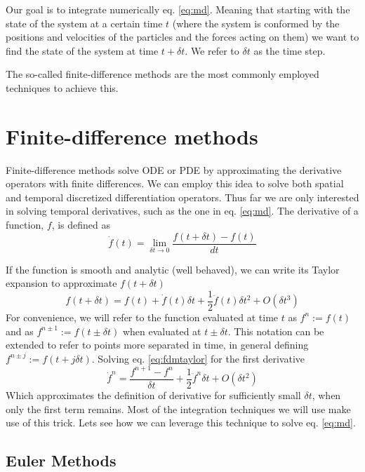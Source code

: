 \documentclass[ twoside,openright,titlepage,numbers=noenddot,%
headinclude,footinclude,cleardoublepage=empty,abstract=on,
BCOR=5mm,paper=a4,fontsize=11pt, dvipsnames
]{scrreprt}
\newcommand{\dt}{\delta t}
\newcommand{\half}{\frac{1}{2}}
\begin{document}
Our goal is to integrate numerically eq. \eqref{eq:md}. Meaning that starting with the state of the system at a certain time $t$ (where the system is conformed by the positions and velocities of the particles and the forces acting on them) we want to find the state of the system at time $t + \dt$. We refer to $\dt$ as the time step.

The so-called finite-difference methods are the most commonly employed techniques to achieve this.
\section{Finite-difference methods}
Finite-difference methods\cite{fdm} solve \gls{ODE} or \gls{PDE} by approximating the derivative operators with finite differences.
We can employ this idea to solve both spatial and temporal discretized differentiation operators. Thus far we are only interested in solving temporal derivatives, such as the one in eq. \eqref{eq:md}.
The derivative of a function, $f$, is defined as
\begin{equation}
  \dot{f}(t) = \lim_{\dt\rightarrow 0} \frac{f(t+\dt) - f(t)}{dt}
\end{equation}

If the function is smooth and analytic (well behaved), we can write its Taylor expansion to approximate $f(t+\dt)$
\begin{equation}
  \label{eq:fdmtaylor}
  f(t+\dt) = f(t)+\dot{f}(t)\dt + \half\ddot{f}(t)\dt^2 + O(\dt^3)
\end{equation}
For convenience, we will refer to the function evaluated at time $t$ as $f^n := f(t)$ and as $f^{n\pm 1} := f(t\pm \dt)$ when evaluated at $t\pm \dt$. This notation can be extended to refer to points more separated in time, in general defining $f^{n\pm j} := f(t+j\dt)$.
Solving eq. \eqref{eq:fdmtaylor} for the first derivative
\begin{equation}
 \dot{f}^n  =  \frac{f^{n+1} - f^n}{\dt} + \half\ddot{f}^n\dt + O(\dt^2)
\end{equation}
Which approximates the definition of derivative for sufficiently small $\dt$, when only the first term remains.
Most of the integration techniques we will use make use of this trick.
Lets see how we can leverage this technique to solve eq. \eqref{eq:md}.
\subsection{Euler Methods}\label{sec:euler}
\end{document}
